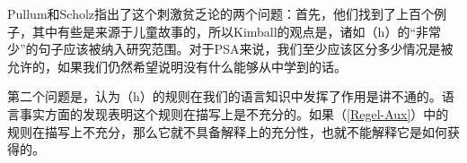 
Pullum和Scholz指出了这个刺激贫乏论的两个问题：首先，他们找到了上百个例子，其中有些是来源于儿童故事的，所以Kimball的观点是，诸如（h）的“非常少”的句子应该被纳入研究范围。对于PSA来说，我们至少应该区分多少情况是被允许的，如果我们仍然希望说明没有什么能够从中学到的话\citep[]{PS2002a}。

  第二个问题是，认为（h）的规则在我们的语言知识中发挥了作用是讲不通的。语言事实方面的发现表明这个规则在描写上是不充分的。如果（\ref{Regel-Aux}）中的规则在描写上不充分，那么它就不具备解释上的充分性，也就不能解释它是如何获得的。

